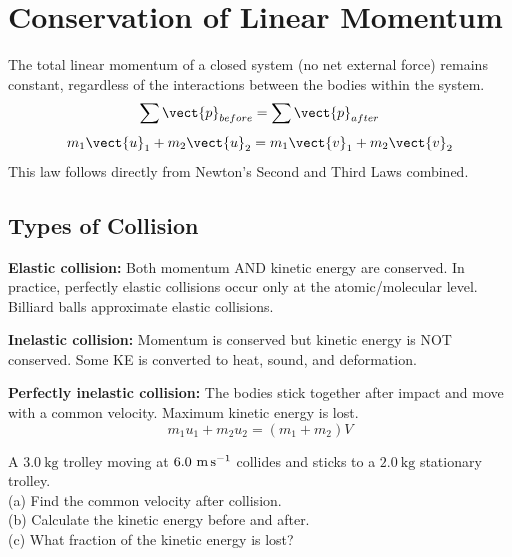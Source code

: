 \section{Conservation of Linear Momentum}

\begin{lawbox}
The total linear momentum of a closed system (no net
external force) remains constant, regardless of the
interactions between the bodies within the system.
\[
  \sum \vect{p}_{before}
  = \sum \vect{p}_{after}
\]
\[
  m_1\vect{u}_1 + m_2\vect{u}_2
  = m_1\vect{v}_1 + m_2\vect{v}_2
\]
This law follows directly from Newton's Second and Third
Laws combined.
\end{lawbox}

\subsection{Types of Collision}

\begin{definitionbox}
\textbf{Elastic collision:} Both momentum AND kinetic
energy are conserved. In practice, perfectly elastic
collisions occur only at the atomic/molecular level.
Billiard balls approximate elastic collisions.

\vspace{0.4cm}

\textbf{Inelastic collision:} Momentum is conserved but
kinetic energy is NOT conserved. Some KE is converted
to heat, sound, and deformation.

\vspace{0.4cm}

\textbf{Perfectly inelastic collision:} The bodies stick
together after impact and move with a common velocity.
Maximum kinetic energy is lost.
\[
  m_1u_1 + m_2u_2 = (m_1+m_2)V
\]
\end{definitionbox}

\begin{examplebox}[4.2]
A $3.0\ \text{kg}$ trolley moving at
$6.0\ \text{m\,s}^{-1}$ collides and sticks to a
$2.0\ \text{kg}$ stationary trolley.\\
(a) Find the common velocity after collision.\\
(b) Calculate the kinetic energy before and after.\\
(c) What fraction of the kinetic energy is lost?
\end{examplebox}

